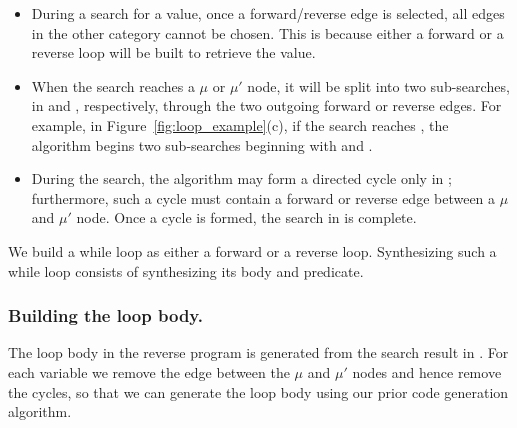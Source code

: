 \begin{itemize}
\item During a search for a value, once a forward/reverse edge is selected, all edges in the other category cannot be chosen. This is because either a forward or a reverse loop will be built to retrieve the value.

\item When the search reaches a $\mu$ or $\mu'$ node, it will be split into two sub-searches, in \pVSG and \lVSG, respectively, through the two outgoing forward or reverse edges.
For example, in Figure~\ref{fig:loop_example}(c), if the search reaches \vmu, the algorithm begins two sub-searches beginning with \vinit and \viter.

\item During the search, the algorithm may form a directed cycle only in \lVSG; furthermore, such a cycle must contain a forward or reverse edge between a $\mu$ and $\mu'$ node. 
Once a cycle is formed, the search in \lVSG is complete.
\end{itemize}

\noindent
We build a while loop as either a forward or a reverse loop. 
Synthesizing such a while loop consists of synthesizing its body and predicate.


\subsubsection{Building the loop body.}

The loop body in the reverse program is generated from the search result in \lVSG.
For each variable we remove the edge between the $\mu$ and $\mu'$ nodes and hence remove the cycles, so that we can generate the loop body using our prior code generation algorithm.


